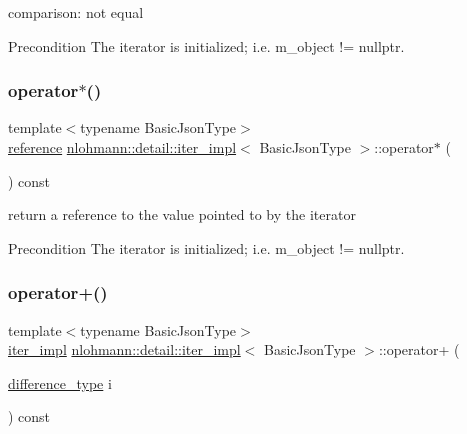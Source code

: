 comparison\+: not equal 

\begin{DoxyPrecond}{Precondition}
The iterator is initialized; i.\+e. {\ttfamily m\+\_\+object != nullptr}. 
\end{DoxyPrecond}
\mbox{\label{classnlohmann_1_1detail_1_1iter__impl_a5ca57856d9bba54a5fc51cee891de827}} 
\subsubsection{\texorpdfstring{operator$\ast$()}{operator*()}}
{\footnotesize\ttfamily template$<$typename Basic\+Json\+Type$>$ \\
\hyperlink{classnlohmann_1_1detail_1_1iter__impl_a5be8001be099c6b82310f4d387b953ce}{reference} \hyperlink{classnlohmann_1_1detail_1_1iter__impl}{nlohmann\+::detail\+::iter\+\_\+impl}$<$ Basic\+Json\+Type $>$\+::operator$\ast$ (\begin{DoxyParamCaption}{ }\end{DoxyParamCaption}) const\hspace{0.3cm}{\ttfamily [inline]}}



return a reference to the value pointed to by the iterator 

\begin{DoxyPrecond}{Precondition}
The iterator is initialized; i.\+e. {\ttfamily m\+\_\+object != nullptr}. 
\end{DoxyPrecond}
\mbox{\label{classnlohmann_1_1detail_1_1iter__impl_a8ef76aeb5a5032768f0f61f48ac189c0}} 
\subsubsection{\texorpdfstring{operator+()}{operator+()}}
{\footnotesize\ttfamily template$<$typename Basic\+Json\+Type$>$ \\
\hyperlink{classnlohmann_1_1detail_1_1iter__impl}{iter\+\_\+impl} \hyperlink{classnlohmann_1_1detail_1_1iter__impl}{nlohmann\+::detail\+::iter\+\_\+impl}$<$ Basic\+Json\+Type $>$\+::operator+ (\begin{DoxyParamCaption}\item[{\hyperlink{classnlohmann_1_1detail_1_1iter__impl_a2f7ea9f7022850809c60fc3263775840}{difference\+\_\+type}}]{i }\end{DoxyParamCaption}) const\hspace{0.3cm}{\ttfamily [inline]}}



